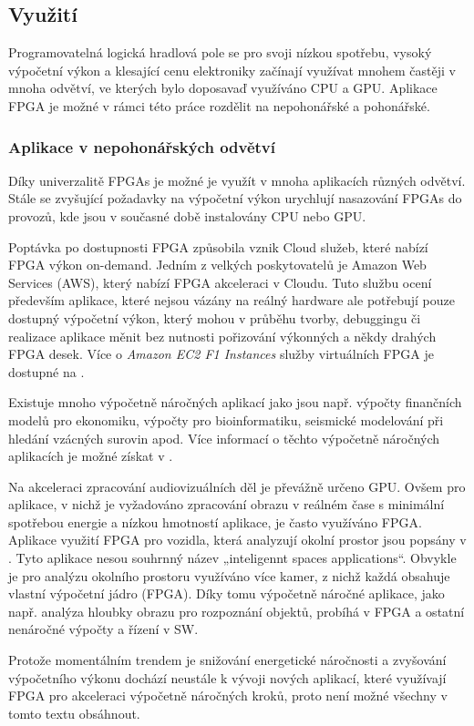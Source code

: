 \documentclass[a4paper, twoside, 11pt]{article}
\begin{document}
			\subsection{Využití}
			Programovatelná logická hradlová pole se pro svoji nízkou spotřebu, vysoký výpočetní výkon a klesající cenu elektroniky začínají využívat mnohem častěji v mnoha odvětví, ve kterých bylo doposavaď využíváno CPU a GPU. Aplikace FPGA je možné v rámci této práce rozdělit na nepohonářské a pohonářské.

			\subsubsection{Aplikace v nepohonářských odvětví}
				Díky univerzalitě FPGAs je možné je využít v mnoha aplikacích různých odvětví. Stále se zvyšující požadavky na výpočetní výkon urychlují nasazování FPGAs do provozů, kde jsou v současné době instalovány CPU nebo GPU.\par
				Poptávka po dostupnosti FPGA způsobila vznik Cloud služeb, které nabízí FPGA výkon on-demand. Jedním z velkých poskytovatelů je Amazon Web Services (AWS), který nabízí FPGA akceleraci v Cloudu. Tuto službu ocení především aplikace, které nejsou vázány na reálný hardware ale potřebují pouze dostupný výpočetní výkon, který mohou v průběhu tvorby, debuggingu či realizace aplikace měnit bez nutnosti pořizování výkonných a někdy drahých FPGA desek. Více o \textit{Amazon EC2 F1 Instances} služby virtuálních FPGA je dostupné na \cite{amazon-ec2-f1}.\par
				Existuje mnoho výpočetně náročných aplikací jako jsou např. výpočty finančních modelů pro ekonomiku, výpočty pro bioinformatiku, seismické modelování při hledání vzácných surovin apod. Více informací o těchto výpočetně náročných aplikacích je možné získat v \cite{wim-high-performance-computing-using-fpgas}.\par
				Na akceleraci zpracování audiovizuálních děl je převážně určeno GPU. Ovšem pro aplikace, v nichž je vyžadováno zpracování obrazu v reálném čase s minimální spotřebou energie a nízkou hmotností aplikace, je často využíváno FPGA. Aplikace využití FPGA pro vozidla, která analyzují okolní prostor jsou popsány v \cite{andina-advanced-features-and-industrial-applications-of-fpga}. Tyto aplikace nesou souhrnný název „inteligennt spaces applications“. Obvykle je pro analýzu okolního prostoru využíváno více kamer, z nichž každá obsahuje vlastní výpočetní jádro (FPGA). Díky tomu výpočetně náročné aplikace, jako např. analýza hloubky obrazu pro rozpoznání objektů, probíhá v FPGA a ostatní nenáročné výpočty a řízení v SW. \cite{andina-advanced-features-and-industrial-applications-of-fpga}\par
				Protože momentálním trendem je snižování energetické náročnosti a zvyšování výpočetního výkonu dochází neustále k vývoji nových aplikací, které využívají FPGA pro akceleraci výpočetně náročných kroků, proto není možné všechny v tomto textu obsáhnout.
\end{document}
